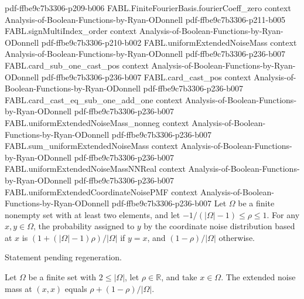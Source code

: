 \begin{theorem}
  {pdf-ffbe9c7b3306-p209-b006}
\proofstep
  {FABL.FiniteFourierBasis.fourierCoeff_zero}
  {context}
  {Analysis-of-Boolean-Functions-by-Ryan-ODonnell}
  {pdf-ffbe9c7b3306-p211-b005}
\proofstep
  {FABL.signMultiIndex_order}
  {context}
  {Analysis-of-Boolean-Functions-by-Ryan-ODonnell}
  {pdf-ffbe9c7b3306-p210-b002}
\proofstep
  {FABL.uniformExtendedNoiseMass}
  {context}
  {Analysis-of-Boolean-Functions-by-Ryan-ODonnell}
  {pdf-ffbe9c7b3306-p236-b007}
\proofstep
  {FABL.card_sub_one_cast_pos}
  {context}
  {Analysis-of-Boolean-Functions-by-Ryan-ODonnell}
  {pdf-ffbe9c7b3306-p236-b007}
\proofstep
  {FABL.card_cast_pos}
  {context}
  {Analysis-of-Boolean-Functions-by-Ryan-ODonnell}
  {pdf-ffbe9c7b3306-p236-b007}
\proofstep
  {FABL.card_cast_eq_sub_one_add_one}
  {context}
  {Analysis-of-Boolean-Functions-by-Ryan-ODonnell}
  {pdf-ffbe9c7b3306-p236-b007}
\proofstep
  {FABL.uniformExtendedNoiseMass_nonneg}
  {context}
  {Analysis-of-Boolean-Functions-by-Ryan-ODonnell}
  {pdf-ffbe9c7b3306-p236-b007}
\proofstep
  {FABL.sum_uniformExtendedNoiseMass}
  {context}
  {Analysis-of-Boolean-Functions-by-Ryan-ODonnell}
  {pdf-ffbe9c7b3306-p236-b007}
\proofstep
  {FABL.uniformExtendedNoiseMassNNReal}
  {context}
  {Analysis-of-Boolean-Functions-by-Ryan-ODonnell}
  {pdf-ffbe9c7b3306-p236-b007}
\proofstep
  {FABL.uniformExtendedCoordinateNoisePMF}
  {context}
  {Analysis-of-Boolean-Functions-by-Ryan-ODonnell}
  {pdf-ffbe9c7b3306-p236-b007}
Let $\Omega$ be a finite nonempty set with at least two elements, and let
$-1/(|\Omega|-1)\le \rho \le 1$. For any $x,y\in\Omega$, the probability assigned to $y$
by the coordinate noise distribution based at $x$ is $(1+(|\Omega|-1)\rho)/|\Omega|$ if
$y=x$, and $(1-\rho)/|\Omega|$ otherwise.
\end{theorem}

\begin{theorem}
\label{FABL.uniformExtendedCoordinateNoisePMF_apply_comm}
\leanok
{}
Statement pending regeneration.
\end{theorem}

\begin{theorem}
\label{FABL.uniformExtendedNoiseMass_self}
\leanok
{}
Let $\Omega$ be a finite set with $2\leq |\Omega|$, let $\rho\in\mathbb{R}$, and take
$x\in\Omega$. The extended noise mass at $(x,x)$ equals $\rho+(1-\rho)/|\Omega|$.
\end{theorem}

